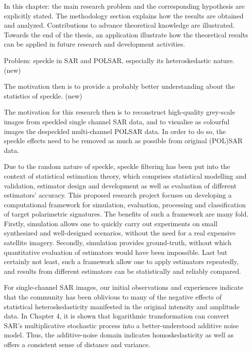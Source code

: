 In this chapter: the main research problem and the corresponding hypothesis are explicitly stated.
The methodology section explains how the results are obtained and analyzed.
Contributions to advance theoretical knowledge are illustrated.
Towards the end of the thesis, an application illustrate how the theoretical results can be applied in future research and development activities.

Problem: speckle in SAR and POLSAR, especially its heteroskedastic nature. (new)

The motivation then is to provide a probably better understanding about the statistics of speckle. (new)

The motivation for this research then is to reconstruct high-quality grey-scale images from speckled single channel SAR data, and to visualise as colourful images the despeckled multi-channel POLSAR data.
In order to do so, the speckle effects need to be removed as much as possible from original (POL)SAR data.

Due to the random nature of speckle, speckle filtering has been put into the context of statistical estimation theory, which comprises statistical modelling and validation, estimator design and development as well as evaluation of different estimators' accuracy.
This proposed research project focuses on developing a computational framework for simulation, evaluation, processing and classification of target polarimetric signatures.
The benefits of such a framework are many fold.
Firstly, simulation allows one to quickly carry out experiments on small synthesized and well-designed scenarios, without the need for a real expensive satellite imagery.
Secondly, simulation provides ground-truth, without which quantitative evaluation of estimators would have been impossible.
Last but certainly not least, such a framework allow one to apply estimators repeatedly, and results from different estimators can be statistically and reliably compared.
 
For single-channel SAR images, our initial observations and experiences indicate that the community has been oblivious to many of the negative effects of statistical heteroskedasticity manifested in the original intensity and amplitude data.
In Chapter 4, it is shown that logarithmic transformation can convert SAR's multiplicative stochastic process into a better-understood additive noise model.
Thus, the additive-noise domain indicates homoskedasticity as well as offers a consistent sense of distance and variance.

